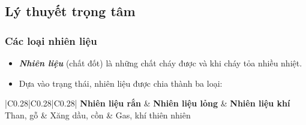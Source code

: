 \documentclass[Main.tex]{subfiles}
\begin{document}
\subsection{Lý thuyết trọng tâm}
\begin{kienthuccannho}
	\subsubsection{Các loại nhiên liệu}
	\begin{itemize}
		\item \textbf{\textit{Nhiên liệu}} (chất đốt) là những chất cháy được và khi cháy tỏa nhiều nhiệt.
		\item Dựa vào trạng thái, nhiên liệu được chia thành ba loại:
	\end{itemize}
	\begin{center}
		\renewcommand{\arraystretch}{1.15}
		\begin{tabular}{|C{0.28\linewidth}|C{0.28\linewidth}|C{0.28\linewidth}|}
			\hline
			\textbf{Nhiên liệu rắn} & \textbf{Nhiên liệu lỏng} & \textbf{Nhiên liệu khí} \\
			\hline
			Than, gỗ & Xăng dầu, cồn & Gas, khí thiên nhiên \\
			\hline
		\end{tabular}
	\end{center}

\end{kienthuccannho}
\end{document}
